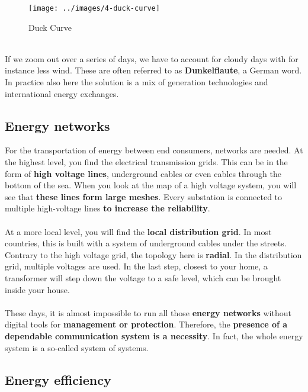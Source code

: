 \documentclass[../summary.tex]{subfiles}
\begin{document}
\begin{figure}[H]
	\centering
	\texttt{[image: ../images/4-duck-curve]}
	\caption{Duck Curve}
	\label{fig:duck-curve}
\end{figure}

\ \\
If we zoom out over a series of days, we have to account for cloudy days with for instance less wind. These are often referred to as \textbf{Dunkelflaute}, a German word. In practice also here the solution is a mix of generation technologies and international energy exchanges.

\subsection{Energy networks}

For the transportation of energy between end consumers, networks are needed. At the highest level, you find the electrical transmission grids. This can be in the form of \textbf{high voltage lines}, underground cables or even cables through the bottom of the sea. When you look at the map of a high voltage system, you will see that \textbf{these lines form large meshes}. Every substation is connected to multiple high-voltage lines \textbf{to increase the reliability}.
\\\\
At a more local level, you will find the \textbf{local distribution grid}. In most countries, this is built with a system of underground cables under the streets. Contrary to the high voltage grid, the topology here is \textbf{radial}. In the distribution grid, multiple voltages are used. In the last step, closest to your home, a transformer will step down the voltage to a safe level, which can be brought inside your house.
\\\\
These days, it is almost impossible to run all those \textbf{energy networks} without digital tools for \textbf{management or protection}. Therefore, the \textbf{presence of a dependable communication system is a necessity}. In fact, the whole energy system is a so-called system of systems.

\subsection{Energy efficiency}
\end{document}
